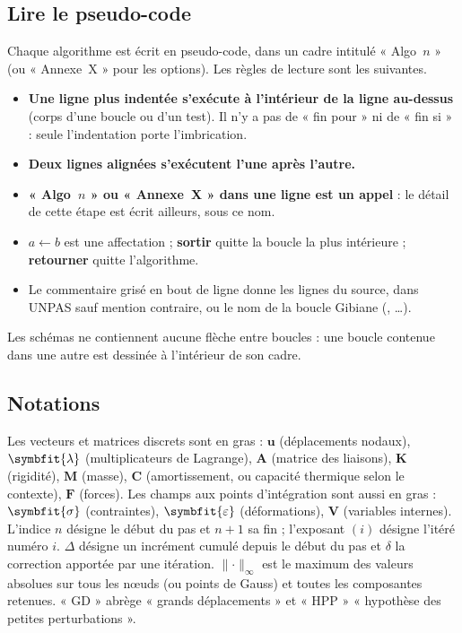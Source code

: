 \documentclass[11pt,a4paper]{article}
\numberwithin{equation}{section}
\newcommand{\src}[1]{\texttt{\detokenize{#1}}}          %
\newcommand{\pr}[1]{\textsf{#1}}                        %
\newcommand{\vc}[1]{\symbf{#1}}                         %
\newcommand{\eps}{\varepsilon}
\newcommand{\sig}{\symbfit{\sigma}}
\newcommand{\vg}[1]{\symbfit{#1}}                       %
\newcommand{\norminf}[1]{\lVert #1\rVert_{\infty}}
\newcommand{\Sortir}{\textbf{sortir}}
\newcommand{\Retourner}{\textbf{retourner}}
\begin{document}
\subsection{Lire le pseudo-code}

Chaque algorithme est écrit en pseudo-code, dans un cadre intitulé « Algo~$n$ » (ou « Annexe~X » pour les options).
Les règles de lecture sont les suivantes.

\begin{itemize}
\item \textbf{Une ligne plus indentée s'exécute à l'intérieur de la ligne au-dessus} (corps d'une boucle ou d'un test). Il n'y a pas de « fin pour » ni de « fin si » : seule l'indentation porte l'imbrication.
\item \textbf{Deux lignes alignées s'exécutent l'une après l'autre.}
\item \textbf{« Algo~$n$ » ou « Annexe~X » dans une ligne est un appel} : le détail de cette étape est écrit ailleurs, sous ce nom.
\item $a \gets b$ est une affectation ; \Sortir{} quitte la boucle la plus intérieure ; \Retourner{} quitte l'algorithme.
\item Le commentaire grisé en bout de ligne donne les lignes du source, dans \pr{UNPAS} sauf mention contraire, ou le nom de la boucle Gibiane (\src{BEXTERN}, \src{ETIQ}…).
\end{itemize}

Les schémas ne contiennent aucune flèche entre boucles : une boucle contenue dans une autre est dessinée à l'intérieur de son cadre.

\subsection{Notations}

Les vecteurs et matrices discrets sont en gras : $\vc u$ (déplacements nodaux), $\vg\lambda$ (multiplicateurs de Lagrange), $\vc A$ (matrice des liaisons), $\vc K$ (rigidité), $\vc M$ (masse), $\vc C$ (amortissement, ou capacité thermique selon le contexte), $\vc F$ (forces).
Les champs aux points d'intégration sont aussi en gras : $\sig$ (contraintes), $\vg\eps$ (déformations), $\vc V$ (variables internes).
L'indice $n$ désigne le début du pas et $n+1$ sa fin ; l'exposant $(i)$ désigne l'itéré numéro $i$.
$\Delta$ désigne un incrément cumulé depuis le début du pas et $\delta$ la correction apportée par une itération.
$\norminf{\cdot}$ est le maximum des valeurs absolues sur tous les nœuds (ou points de Gauss) et toutes les composantes retenues.
« GD » abrège « grands déplacements » et « HPP » « hypothèse des petites perturbations ».
\end{document}
